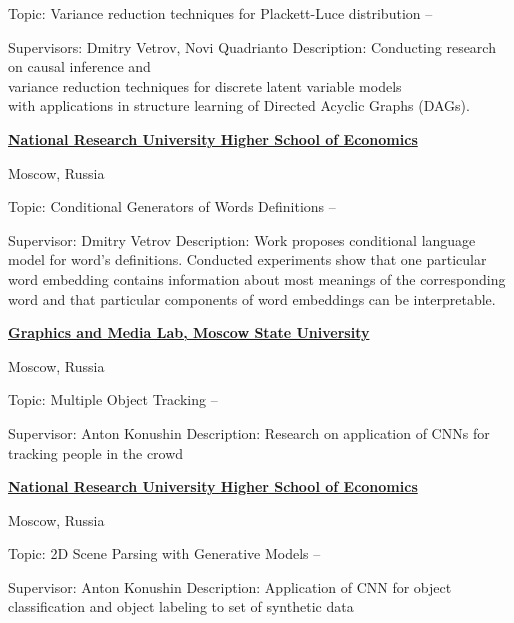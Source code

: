 \documentclass[letterpaper,MMMyyyy,nonstopmode]{simpleresumecv}
\begin{document}
\begin{Body}
\Gap
\BulletItem
Topic: Variance reduction techniques for Plackett-Luce distribution
\hfill
{} --
\begin{Detail}
\SubBulletItem
Supervisors:
Dmitry Vetrov, Novi Quadrianto
\SubBulletItem
Description:
Conducting research on causal inference and\\ variance reduction techniques for discrete latent variable models\\ with applications in structure learning of Directed Acyclic Graphs (DAGs).
\end{Detail}

\Entry
\href{https://www.hse.ru/en/}
{\textbf{National Research University Higher School of Economics}}
\par
Moscow, Russia

\Gap
\BulletItem
Topic: Conditional Generators of Words Definitions
\hfill
{} --
\begin{Detail}
\SubBulletItem
Supervisor:
Dmitry Vetrov
\SubBulletItem
Description:
Work proposes conditional language model for word’s definitions. \newline
Conducted experiments show that one particular word embedding contains \newline
information about most meanings of the corresponding word and that \newline
particular components of word embeddings can be interpretable.
\end{Detail}

\newpage

\Entry
\href{http://graphics.cs.msu.ru/en}
{\textbf{Graphics and Media Lab, Moscow State University}}
\par
Moscow, Russia

\Gap
\BulletItem
Topic: Multiple Object Tracking
\hfill
{} --
\begin{Detail}
\SubBulletItem
Supervisor:
Anton Konushin
\SubBulletItem
Description:
Research on application of CNNs for tracking people in the crowd
\end{Detail}

\Gap

\Entry
\href{https://www.hse.ru/en/}
{\textbf{National Research University Higher School of Economics}}
\par
Moscow, Russia

\Gap
\BulletItem
Topic: 2D Scene Parsing with Generative Models
\hfill
{} --
\begin{Detail}
\SubBulletItem
Supervisor:
Anton Konushin
\SubBulletItem
Description:
Application of CNN for object classification and object labeling to \newline
set of synthetic data
\end{Detail}


\end{Body}
\end{document}
